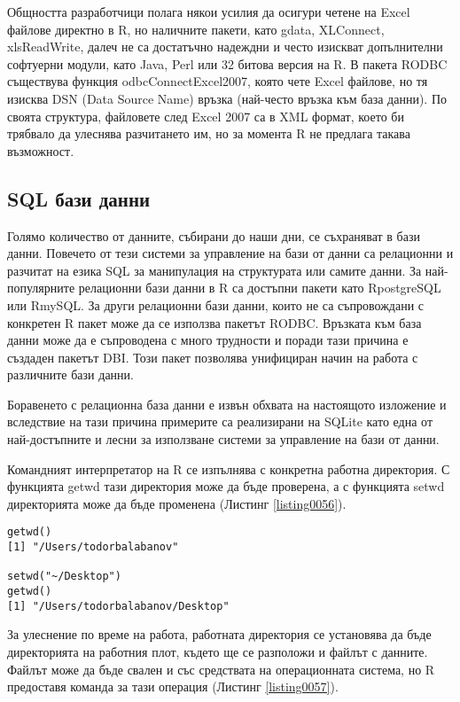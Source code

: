 Общността разработчици полага някои усилия да осигури четене на Excel файлове директно в R, но наличните пакети, като gdata, XLConnect, xlsReadWrite, далеч не са достатъчно надеждни и често изискват допълнителни софтуерни модули, като Java, Perl или 32 битова версия на R. В пакета RODBC съществува функция odbcConnectExcel2007, която чете Excel файлове, но тя изисква DSN (Data Source Name) връзка (най-често връзка към база данни). По своята структура, файловете след Excel 2007 са в XML формат, което би трябвало да улеснява разчитането им, но за момента R не предлага такава възможност.

\subsection{SQL бази данни}

Голямо количество от данните, събирани до наши дни, се съхраняват в бази данни. Повечето от тези системи за управление на бази от данни са релационни и разчитат на езика SQL\cite{sql} за манипулация на структурата или самите данни. За най-популярните релационни бази данни в R са достъпни пакети като RpostgreSQL или RmySQL. За други релационни бази данни, които не са съпровождани с конкретен R пакет може да се използва пакетът RODBC. Връзката към база данни може да е съпроводена с много трудности и поради тази причина е създаден пакетът DBI. Този пакет позволява унифициран начин на работа с различните бази данни.

Боравенето с релационна база данни е извън обхвата на настоящото изложение и вследствие на тази причина примерите са реализирани на SQLite като една от най-достъпните и лесни за използване системи за управление на бази от данни.

Командният интерпретатор на R се изпълнява с конкретна работна директория. С функцията getwd тази директория може да бъде проверена, а с функцията setwd директорията може да бъде променена (Листинг \ref{listing0056}).

\begin{lstlisting}[caption=Работна директория, label=listing0056]
getwd()
[1] "/Users/todorbalabanov"

setwd("~/Desktop")
getwd()
[1] "/Users/todorbalabanov/Desktop"
\end{lstlisting}

За улеснение по време на работа, работната директория се установява да бъде директорията на работния плот, където ще се разположи и файлът с данните. Файлът може да бъде свален и със средствата на операционната система, но R предоставя команда за тази операция (Листинг \ref{listing0057}).

